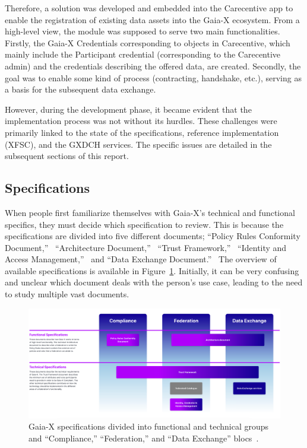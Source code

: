 Therefore, a solution was developed and embedded into the Carecentive app to enable the registration of existing data assets into the Gaia-X ecosystem.
From a high-level view, the module was supposed to serve two main functionalities.
Firstly, the Gaia-X Credentials corresponding to objects in Carecentive, which mainly include the Participant credential (corresponding to the Carecentive admin) and the credentials describing the offered data, are created.
Secondly, the goal was to enable some kind of process (contracting, handshake, etc.), serving as a basis for the subsequent data exchange.

However, during the development phase, it became evident that the implementation process was not without its hurdles.
These challenges were primarily linked to the state of the specifications, reference implementation (XFSC), and the GXDCH services.
The specific issues are detailed in the subsequent sections of this report.

\subsection{Specifications}\label{subsec:specifications}

When people first familiarize themselves with Gaia-X's technical and functional specifics, they must decide which specification to review.
This is because the specifications are divided into five different documents; ``Policy Rules Conformity Document,''~\cite{gaiax_policy_rules} ``Architecture Document,''~\cite{gaiax_architecture_document} ``Trust Framework,''~\cite{gaiax_trust_framework} ``Identity and Access Management,''~\cite{gaiax_identity_and_access_management} and ``Data Exchange Document.''~\cite{gaiax_data_exchange_document}
The overview of available specifications is available in Figure~\ref{fig:specifications}.
Initially, it can be very confusing and unclear which document deals with the person's use case, leading to the need to study multiple vast documents.

\begin{figure}
    \centering
    \includegraphics[width=\textwidth]{figures/specifications.png}
    \caption{Gaia-X specifications divided into functional and technical groups and ``Compliance,'' ``Federation,'' and ``Data Exchange'' blocs~\cite{gaiax}.}\label{fig:specifications}
\end{figure}

